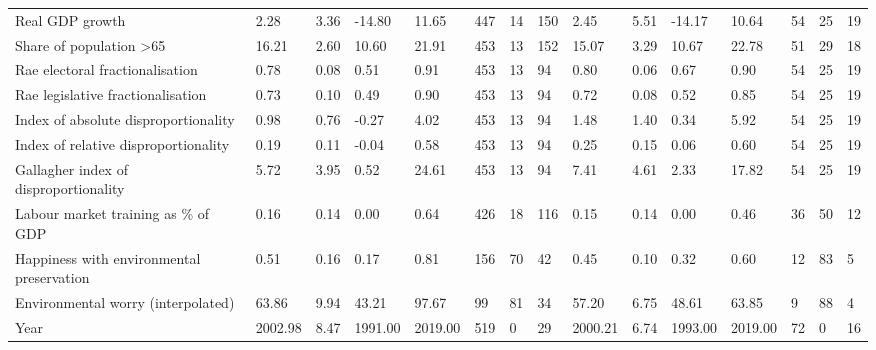 \begin{longtable}{lllllllllllllll}
Real GDP growth & 2.28 & 3.36 & -14.80 & 11.65 & 447 & 14 & 150 & 2.45 & 5.51 & -14.17 & 10.64 & 54 & 25 & 19\\
\addlinespace
Share of population >65 & 16.21 & 2.60 & 10.60 & 21.91 & 453 & 13 & 152 & 15.07 & 3.29 & 10.67 & 22.78 & 51 & 29 & 18\\
Rae electoral fractionalisation & 0.78 & 0.08 & 0.51 & 0.91 & 453 & 13 & 94 & 0.80 & 0.06 & 0.67 & 0.90 & 54 & 25 & 19\\
Rae legislative fractionalisation & 0.73 & 0.10 & 0.49 & 0.90 & 453 & 13 & 94 & 0.72 & 0.08 & 0.52 & 0.85 & 54 & 25 & 19\\
Index of absolute disproportionality & 0.98 & 0.76 & -0.27 & 4.02 & 453 & 13 & 94 & 1.48 & 1.40 & 0.34 & 5.92 & 54 & 25 & 19\\
Index of relative disproportionality & 0.19 & 0.11 & -0.04 & 0.58 & 453 & 13 & 94 & 0.25 & 0.15 & 0.06 & 0.60 & 54 & 25 & 19\\
\addlinespace
Gallagher index of disproportionality & 5.72 & 3.95 & 0.52 & 24.61 & 453 & 13 & 94 & 7.41 & 4.61 & 2.33 & 17.82 & 54 & 25 & 19\\
Labour market training as \% of GDP & 0.16 & 0.14 & 0.00 & 0.64 & 426 & 18 & 116 & 0.15 & 0.14 & 0.00 & 0.46 & 36 & 50 & 12\\
Happiness with environmental preservation & 0.51 & 0.16 & 0.17 & 0.81 & 156 & 70 & 42 & 0.45 & 0.10 & 0.32 & 0.60 & 12 & 83 & 5\\
Environmental worry (interpolated) & 63.86 & 9.94 & 43.21 & 97.67 & 99 & 81 & 34 & 57.20 & 6.75 & 48.61 & 63.85 & 9 & 88 & 4\\
Year & 2002.98 & 8.47 & 1991.00 & 2019.00 & 519 & 0 & 29 & 2000.21 & 6.74 & 1993.00 & 2019.00 & 72 & 0 & 16\\
\bottomrule
\end{longtable}

